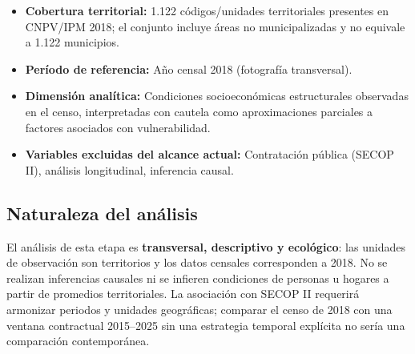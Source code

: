 \begin{itemize}
    \item \textbf{Cobertura territorial:} 1.122 códigos/unidades territoriales presentes en CNPV/IPM 2018; el conjunto incluye áreas no municipalizadas y no equivale a 1.122 municipios.
    \item \textbf{Período de referencia:} Año censal 2018 (fotografía transversal).
    \item \textbf{Dimensión analítica:} Condiciones socioeconómicas estructurales observadas en el censo, interpretadas con cautela como aproximaciones parciales a factores asociados con vulnerabilidad.
    \item \textbf{Variables excluidas del alcance actual:} Contratación pública (SECOP II), análisis longitudinal, inferencia causal.
\end{itemize}

\subsection{Naturaleza del análisis}
\label{sec:naturaleza}

El análisis de esta etapa es \textbf{transversal, descriptivo y ecológico}: las unidades de observación son territorios y los datos censales corresponden a 2018. No se realizan inferencias causales ni se infieren condiciones de personas u hogares a partir de promedios territoriales. La asociación con SECOP II requerirá armonizar periodos y unidades geográficas; comparar el censo de 2018 con una ventana contractual 2015--2025 sin una estrategia temporal explícita no sería una comparación contemporánea.
